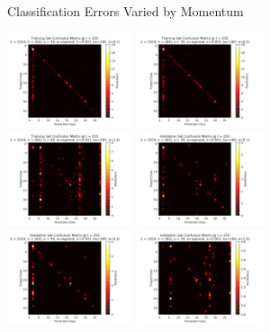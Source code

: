 \documentclass[10pt,epsf]{article}
\begin{document}
{{\begin{figure}[H]
      \caption{Classification Errors Varied by Momentum}
      \label{fig:error-by-m}
    \end{figure}
    \begin{figure}[H]
      \includegraphics[width=0.33\textwidth]{./img/64-0.001-160-0.1-sigmoid-1/confusion-matrix-training-255.png}
      \includegraphics[width=0.33\textwidth]{./img/64-0.001-160-0.5-sigmoid-1/confusion-matrix-training-255.png}
      \includegraphics[width=0.33\textwidth]{./img/64-0.001-160-1-sigmoid-1/confusion-matrix-training-255.png}
      \includegraphics[width=0.33\textwidth]{./img/64-0.001-160-0.1-sigmoid-1/confusion-matrix-validation-255.png}
      \includegraphics[width=0.33\textwidth]{./img/64-0.001-160-0.5-sigmoid-1/confusion-matrix-validation-255.png}
      \includegraphics[width=0.33\textwidth]{./img/64-0.001-160-1-sigmoid-1/confusion-matrix-validation-255.png}

\end{figure}}}
\end{document}
